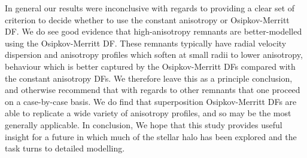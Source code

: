 In general our results were inconclusive with regards to providing a clear set of criterion to decide whether to use the constant anisotropy or Osipkov-Merritt DF. We do see good evidence that high-anisotropy remnants are better-modelled using the Osipkov-Merritt DF. These remnants typically have radial velocity dispersion and anisotropy profiles which soften at small radii to lower anisotropy, behaviour which is better captured by the Osipkov-Merritt DFs compared with the constant anisotropy DFs. We therefore leave this as a principle conclusion, and otherwise recommend that with regards to other remnants that one proceed on a case-by-case basis. We do find that superposition Osipkov-Merritt DFs are able to replicate a wide variety of anisotropy profiles, and so may be the most generally applicable. In conclusion, We hope that this study provides useful insight for a future in which much of the stellar halo has been explored and the task turns to detailed modelling.








% 









% 

